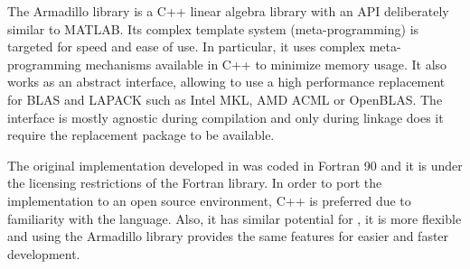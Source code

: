 \documentclass[../thesis]{subfiles}
\begin{document}
	The Armadillo library is a C++ linear algebra library with an API deliberately similar to MATLAB. Its complex template system (meta-programming) is targeted for speed and ease of use. In particular, it uses complex meta-programming mechanisms available in C++ to minimize memory usage. It also works as an abstract interface, allowing to use a high performance replacement for BLAS and LAPACK such as Intel MKL, AMD ACML or OpenBLAS. The interface is mostly agnostic during compilation and only during linkage does it require the replacement package to be available.

	The original implementation developed in \cite{Deadman:Higham:Ralha:2013} was coded in Fortran 90 and it is under the licensing restrictions of the \nag Fortran library. In order to port the implementation to an open source environment, C++ is preferred due to familiarity with the language. Also, it has similar potential for \hpc, it is more flexible and using the Armadillo library provides the same features for easier and faster development.

	
	
	
	
	
	
\end{document}
